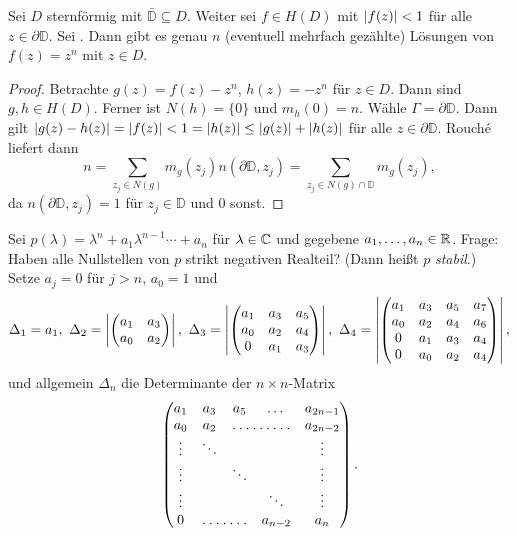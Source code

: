 \documentclass[a4paper,twoside,DIV15,BCOR12mm]{scrbook}
\begin{document}
\begin{bsp}\label{bsp3.19}
  Sei $D$ sternförmig mit $\bar{\mathbb{D}}\subseteq D$. Weiter sei $f\in H(D)$ mit $\left\lvert f(z)\right\lvert<1$ für alle
  $z\in \partial\mathbb{D}$. Sei . Dann gibt es genau $n$ (eventuell mehrfach gezählte) Lösungen von $f(z)=z^n$ mit $z\in D$.
\end{bsp}
\begin{proof}
  Betrachte $g(z)=f(z)-z^n$, $h(z)=-z^n$ für $z\in D$. Dann sind $g, h\in H(D)$. Ferner ist $N(h)=\{0\}$ und $m_h(0)=n$. Wähle
  $\Gamma=\partial\mathbb{D}$. Dann gilt $\left\lvert g(z)-h(z)\right\lvert = \left\lvert f(z)\right\lvert < 1 = \left\lvert h(z)\right\lvert \leq \left\lvert g(z)\right\lvert + \left\lvert h(z)\right\lvert$ für alle
  $z\in\partial\mathbb{D}$. Rouch\'e liefert dann \[ n = \sum_{z_j\in N(g)}{m_g(z_j) n(\partial\mathbb{D}, z_j)} = \sum_{z_j\in
    N(g)\cap\mathbb{D}}{m_g(z_j)}, \] da $n(\partial\mathbb{D}, z_j) = 1$ für $z_j\in\mathbb{D}$ und $0$ sonst.
\end{proof}

Sei $p(\lambda)=\lambda^n+a_1\lambda^{n-1}\dotsb+a_n$ für $\lambda\in\mathbb{C}$ und gegebene $a_1,\dotsc,a_n\in\mathbb{R}$. Frage: Haben alle
Nullstellen von $p$ strikt negativen Realteil? (Dann heißt $p$ \emph{stabil}.) Setze $a_j=0$ für $j>n$, $a_0=1$ und
\[\Delta_1=a_1,\ \Delta_2=\abs{\begin{pmatrix}a_1&a_3\\a_0&a_2\end{pmatrix}},\ 
\Delta_3=\abs{\begin{pmatrix}a_1&a_3&a_5\\a_0&a_2&a_4\\0&a_1&a_3\end{pmatrix}},\ 
\Delta_4=\abs{\begin{pmatrix}a_1&a_3&a_5&a_7\\a_0&a_2&a_4&a_6\\0&a_1&a_3&a_4\\0&a_0&a_2&a_4\end{pmatrix}}, \]
und allgemein $\Delta_n$ die Determinante der $n\times n$-Matrix
\[\begin{pmatrix}
  a_1&a_3&a_5&\dots&a_{2n-1}\\
  a_0&a_2&\hdotsfor{2}&a_{2n-2}\\
  \vdots&\ddots&&&\vdots\\
  \vdots&&\ddots&&\vdots\\
  \vdots&&&\ddots&\vdots\\
  0&\hdotsfor{2}&a_{n-2}&a_n
\end{pmatrix}. \]
\end{document}
